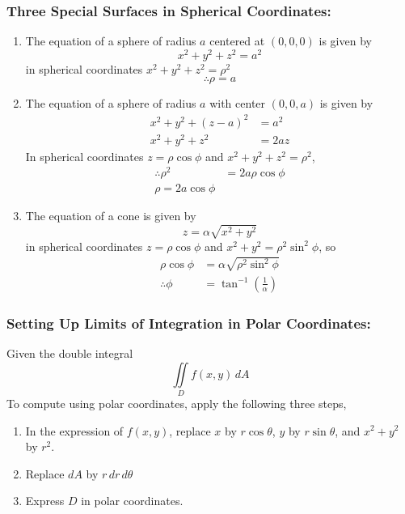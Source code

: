\documentclass[14pt]{article}
\begin{document}
    \subsubsection{Three Special Surfaces in Spherical Coordinates:}
    \begin{enumerate}
        \item The equation of a sphere of radius $a$ centered at $(0,0,0)$ is given by 
        $$x^2+y^2+z^2=a^2$$
        in spherical coordinates $x^2+y^2+z^2=\rho^2$
        $$\therefore \rho=a$$
        \item The equation of a sphere of radius $a$ with center $(0,0,a)$ is given by 
        \begin{align*}
            x^2+y^2+(z-a)^2&=a^2\\
            x^2+y^2+z^2&=2az
        \end{align*}
        In spherical coordinates $z=\rho\cos\phi$ and $x^2+y^2+z^2=\rho^2$, 
        \begin{align*}
            \therefore\rho^2&=2a\rho\cos\phi\\
            \rho=2a\cos\phi
        \end{align*}
        \item The equation of a cone is given by
        $$z=\alpha \sqrt{x^2+y^2}$$
        in spherical coordinates $z=\rho\cos\phi$ and $x^2+y^2=\rho^2\sin^2\phi$, so
        \begin{align*}
            \rho\cos\phi&=\alpha\sqrt{\rho^2\sin^2\phi}\\
            \therefore \phi&=\tan^{-1}\left(\frac{1}{\alpha}\right)
        \end{align*}
    \end{enumerate}
    \subsubsection{Setting Up Limits of Integration in Polar Coordinates:}
    Given the double integral
    $$\iint\limits_Df(x,y)\,dA$$
    To compute using polar coordinates, apply the following three steps,
    \begin{enumerate}
        \item In the expression of $f(x,y)$, replace $x$ by $r\cos\theta$, $y$ by $r\sin\theta$, and $x^2+y^2$ by $r^2$.
        \item Replace $dA$ by $r\, dr\, d\theta$
        \item Express $D$ in polar coordinates.
    \end{enumerate}
\end{document}
